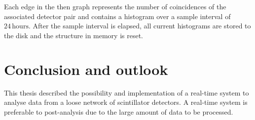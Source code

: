 \documentclass[abstract,toc,los,lof,english,10pt,glossary,acronyms]{jluthesis}
\begin{document}
Each edge in the then graph represents the number of coincidences of the associated detector pair and contains a histogram over a sample interval of $24\,\text{hours}$. After the sample interval is elapsed, all current histograms are stored to the disk and the structure in memory is reset.
\clearpage
\section{Conclusion and outlook}
This thesis described the possibility and implementation of a real-time system to analyse data from a loose network of scintillator detectors. A real-time system is preferable to post-analysis due to the large amount of data to be processed.
\clearpage

\makeback
\end{document}
